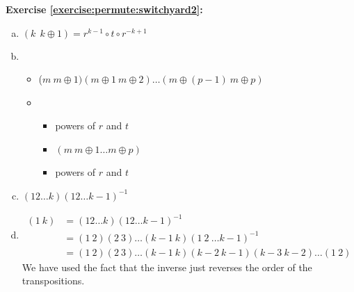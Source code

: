 \noindent\textbf{Exercise \ref{exercise:permute:switchyard2}:} %
\begin{enumerate}[(a)]
\item
 $(k~~k\oplus 1)=r^{k-1}\circ t\circ r^{-k+1}$
 
\item
	\begin{itemize}
	\item
	($m\ m\oplus 1)(m\oplus 1\ m\oplus 2)\dots(m\oplus (p-1)\ m\oplus p)$
	
	\item
		\begin{itemize}
		\item
		powers of $r$ and $t$
		
		\item
		$(m\ m\oplus 1\dots m\oplus p)$
		
		\item
		powers of $r$ and $t$
		\end{itemize}
	\end{itemize}

\item
$(12\dots k)(12\dots k-1)^{-1}$

\item
\begin{align*}
(1\ k) &= (12\dots k)(12\dots k-1)^{-1}\\
&= (1\ 2)(2\ 3)\dots(k-1\ k)(1\ 2\ \dots k-1)^{-1}\\ 
&= (1\ 2)(2\ 3)\dots(k-1\ k)(k-2\ k-1) (k - 3\ k-2)\dots(1\ 2) 
\end{align*}
We have used the fact that  the inverse just reverses the order of the transpositions.


\end{enumerate}
